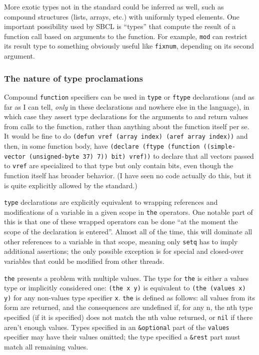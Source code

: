 \documentclass{article}
\begin{document}
More exotic types not in the standard could be inferred as well, such as compound structures (lists, arrays, etc.) with uniformly typed elements. One important possibility used by SBCL is ``types'' that compute the result of a function call based on arguments to the function. For example, \texttt{mod} can restrict its result type to something obviously useful like \texttt{fixnum}, depending on its second argument.


\subsubsection{The nature of type proclamations}

Compound \texttt{function} specifiers can be used in \texttt{type} or \texttt{ftype} declarations (and as far as I can tell, \emph{only} in these declarations and nowhere else in the language), in which case they assert type declarations for the arguments to and return values from calls to the function, rather than anything about the function itself per se. It would be fine to do \texttt{(defun vref (array index) (aref array index))} and then, in some function body, have \texttt{(declare (ftype (function ((simple-vector (unsigned-byte 37) 7)) bit) vref))} to declare that all vectors passed to \texttt{vref} are specialized to that type but only contain bits, even though the function itself has broader behavior. (I have seen no code actually do this, but it is quite explicitly allowed by the standard.)

\texttt{type} declarations are explicitly equivalent to wrapping references and modifications of a variable in a given scope in \texttt{the} operators. One notable part of this is that one of these wrapped operators can be done ``at the moment the scope of the declaration is entered''. Almost all of the time, this will dominate all other references to a variable in that scope, meaning only \texttt{setq} has to imply additional assertions; the only possible exception is for special and closed-over variables that could be modified from other threads.

\texttt{the} presents a problem with multiple values. The type for \texttt{the} is either a values type or implicitly considered one: \texttt{(the x y)} is equivalent to \texttt{(the (values x) y)} for any non-values type specifier \texttt{x}. \texttt{the} is defined as follows: all values from its form are returned, and the consequences are undefined if, for any n, the nth type specified (if it is specified) does not match the nth value returned, or \texttt{nil} if there aren't enough values. Types specified in an \texttt{\&optional} part of the \texttt{values} specifier may have their values omitted; the type specified a \texttt{\&rest} part must match all remaining values.
\end{document}
